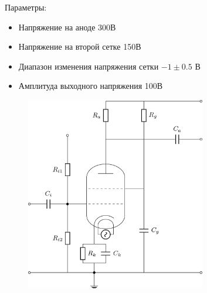 \documentclass[a4paper,14pt]{extarticle}
\begin{document}
    Параметры:
    \begin{itemize}
        \item Напряжение на аноде 300В
        \item Напряжение на второй сетке 150В
        \item Диапазон изменения напряжения сетки \( -1\pm0.5\) В
        \item Амплитуда выходного напряжения 100В
    \end{itemize}

    \begin{figure}
    \begin{center}
        \includegraphics[width=0.7\textwidth]{images/amplifier}
    \end{center}
    \end{figure}
\end{document}
